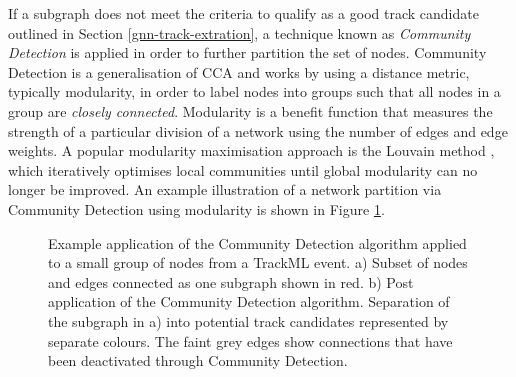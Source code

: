 If a subgraph does not meet the criteria to qualify as a good track candidate outlined in Section \ref{gnn-track-extration}, a technique known as \textit{Community Detection} \cite{community} is applied in order to further partition the set of nodes. Community Detection is a generalisation of CCA and works by using a distance metric, typically modularity, in order to label nodes into groups such that all nodes in a group are \textit{closely connected}. Modularity is a benefit function that measures the strength of a particular division of a network using the number of edges and edge weights. A popular modularity maximisation approach is the Louvain method \cite{python_louvain}, which iteratively optimises local communities until global modularity can no longer be improved. An example illustration of a network partition via Community Detection using modularity is shown in Figure \ref{fig:community-detection}. 

\begin{figure}[htbp!] 
    \centering
    \hfill%
    \caption{Example application of the Community Detection algorithm applied to a small group of nodes from a TrackML event. a) Subset of nodes and edges connected as one subgraph shown in red. b) Post application of the Community Detection algorithm. Separation of the subgraph in a) into potential track candidates represented by separate colours. The faint grey edges show connections that have been deactivated through Community Detection.}
    \label{fig:community-detection}
\end{figure}

